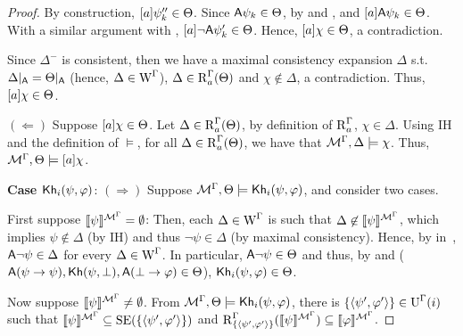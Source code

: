 \begin{proof}
By construction, $[a]\psi''_k \in \Theta$. Since ${\sf A}\psi_k \in \Theta$, by  and , and $[a]{\sf A}\psi_k \in \Theta$. With a similar argument with , $[a]\neg{\sf A}\psi'_k \in \Theta$.
Hence, $[a]\chi \in \Theta$, a contradiction.

Since $\Delta^-$ is consistent, then we have a maximal consistency expansion $\Delta$ s.t. $\Delta\vert_{{\sf A}} = \Theta\vert_{{\sf A}}$ (hence, $\Delta \in \operatorname{W}^\Gamma$), $\Delta \in \operatorname{R}^\Gamma_a(\Theta)$ and $\chi \notin \Delta$,
a contradiction. Thus, $[a]\chi \in \Theta$.
\smallskip

\noindent
$(\Leftarrow)$ Suppose $[a]\chi \in \Theta$. Let $\Delta \in \operatorname{R}^\Gamma_a(\Theta)$, by definition of $\operatorname{R}^\Gamma_a$, $\chi \in \Delta$.
Using IH and the definition of $\models$, for all $\Delta \in \operatorname{R}^\Gamma_a(\Theta)$, we have that $\mathcal{M}^\Gamma,\Delta \models \chi$.
Thus, $\mathcal{M}^\Gamma, \Theta \models [a]\chi$.
\medskip

\noindent
\textbf{Case ${\sf Kh}_i(\psi,\varphi)$}: $(\Rightarrow)$ Suppose $\mathcal{M}^\Gamma, \Theta \models {\sf Kh}_i(\psi,\varphi)$, and consider two cases.
\smallskip

First suppose ${\llbracket \psi \rrbracket^{\mathcal{M}^\Gamma} = \emptyset}$: Then, each $\Delta \in \operatorname{W}^\Gamma$ is such that $\Delta \not\in \llbracket \psi \rrbracket^{\mathcal{M}^\Gamma}$, which implies $\psi \not\in \Delta$ (by IH) and thus $\lnot\psi \in \Delta$ (by maximal consistency).
Hence, by  in~, ${\sf A}\lnot\psi \in \Delta$ for every $\Delta \in \operatorname{W}^\Gamma$. In particular, ${\sf A}\lnot\psi \in \Theta$ and thus, by  and  (${\sf A}(\psi \rightarrow \psi),{\sf Kh}(\psi,\bot),{\sf A}(\bot \rightarrow \varphi) \in \Theta$), ${\sf Kh}_i(\psi, \varphi) \in \Theta$.
\smallskip

Now suppose ${\llbracket \psi \rrbracket^{\mathcal{M}^\Gamma} \neq \emptyset}$.
From $\mathcal{M}^\Gamma, \Theta \models {\sf Kh}_i(\psi,\varphi)$, there is $\{ \langle \psi',\varphi' \rangle \} \in \operatorname{U}^\Gamma(i)$ such that
$\llbracket \psi \rrbracket^{\mathcal{M}^\Gamma} \subseteq \operatorname{SE}(\{ \langle \psi',\varphi' \rangle \})$ and
$\operatorname{R}^\Gamma_{\{ \langle \psi',\varphi' \rangle \}}(\llbracket \psi \rrbracket^{\mathcal{M}^\Gamma}) \subseteq \llbracket \varphi \rrbracket^{\mathcal{M}^\Gamma}$.


\end{proof}
